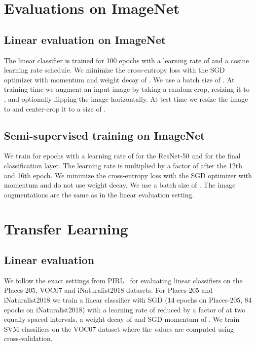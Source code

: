 \documentclass{article}
\begin{document}
\section{Evaluations on ImageNet}

\subsection{Linear evaluation on ImageNet}
\label{sec:linear_evaluation}
The linear classifier is trained for 100 epochs with a learning rate of  and a cosine learning rate schedule. We minimize the cross-entropy loss with the SGD optimizer with momentum and weight decay of . We use a batch size of . At training time we augment an input image by taking a random crop, resizing it to , and optionally flipping the image horizontally. At test time we resize the image to  and center-crop it to a size of .

\subsection{Semi-supervised training on ImageNet}
\label{sec:semisupervised_evaluation}
We train for  epochs with a learning rate of  for the ResNet-50 and  for the final classification layer. The learning rate is multiplied by a factor of  after the 12th and 16th epoch. We minimize the cross-entropy loss with the SGD optimizer with momentum and do not use weight decay. We use a batch size of . The image augmentations are the same as in the linear evaluation setting.

\section{Transfer Learning}

\subsection{Linear evaluation} We follow the exact settings from PIRL~\cite{misra2019self} for evaluating linear classifiers on the Places-205, VOC07 and iNaturalist2018 datasets. For Places-205 and iNaturalist2018 we train a linear classifier with SGD (14 epochs on Places-205, 84 epochs on iNaturalist2018) with a learning rate of  reduced by a factor of  at two equally spaced intervals, a weight decay of  and SGD momentum of . We train SVM classifiers on the VOC07 dataset where the  values are computed using cross-validation.
\end{document}
